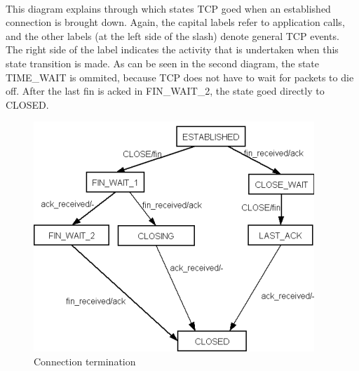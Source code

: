 \documentclass[11pt]{article}
\begin{document}
\paragraph{}
This diagram explains through which states TCP goed when an established
connection is brought down. Again, the capital labels refer to application
calls, and the other labels (at the left side of the slash) denote general TCP
events. The right side of the label indicates the activity that is undertaken
when this state transition is made. As can be seen in the second diagram, the
state TIME_WAIT is ommited, because TCP does not have to wait for packets to
die off. After the last fin is acked in FIN_WAIT_2, the state goed directly to
CLOSED.

\begin{figure}
\begin{center}
\includegraphics{termination.png}
\end{center}
\caption{Connection termination}
\label{figuur:termination}
\end{figure}
\end{document}
